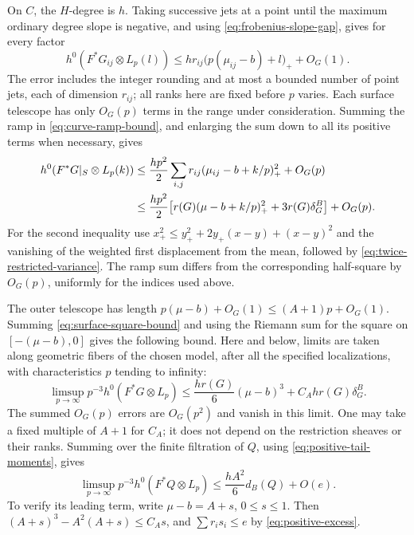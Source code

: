 On $C$, the $H$-degree is $h$.  Taking successive jets at a point
until the maximum ordinary degree slope is negative, and using
\eqref{eq:frobenius-slope-gap}, gives for every factor
\begin{equation}\label{eq:curve-ramp-bound}
 h^0(F^*G_{ij}\otimes L_p(l))
 \leq h r_{ij}\bigl(p(\mu_{ij}-b)+l\bigr)_++O_G(1).
\end{equation}
The error includes the integer rounding and at most a bounded
number of point jets, each of dimension $r_{ij}$; all ranks here
are fixed before $p$ varies.  Each surface telescope has only
$O_G(p)$ terms in the range under consideration.  Summing the
ramp in \eqref{eq:curve-ramp-bound}, and enlarging the sum down
to all its positive terms when necessary, gives
\begin{align}
 h^0(F^*G|_S\otimes L_p(k))
 &\leq\frac{hp^2}{2}\sum_{i,j}r_{ij}
        (\mu_{ij}-b+k/p)_+^2+O_G(p)\notag\\
 &\leq\frac{hp^2}{2}\bigl[
 r(G)(\mu-b+k/p)_+^2+3r(G)\delta_G^B\bigr]+O_G(p).
 \label{eq:surface-square-bound}
\end{align}
For the second inequality use
$x_+^2\leq y_+^2+2y_+(x-y)+(x-y)^2$ and the vanishing of the
weighted first displacement from the mean, followed by
\eqref{eq:twice-restricted-variance}.  The ramp sum differs from
the corresponding half-square by $O_G(p)$, uniformly for the
indices used above.

The outer telescope has length
$p(\mu-b)+O_G(1)\leq(A+1)p+O_G(1)$.  Summing
\eqref{eq:surface-square-bound} and using the Riemann sum for
the square on $[-(\mu-b),0]$ gives the following bound.
Here and below, limits are taken along geometric fibers of the chosen
model, after all the specified localizations, with characteristics
$p$ tending to infinity:
\begin{equation}\label{eq:tail-factor-frobenius}
 \limsup_{p\to\infty}p^{-3}h^0(F^*G\otimes L_p)
 \leq\frac{h r(G)}6(\mu-b)^3
       +C_Ah r(G)\delta_G^B.
\end{equation}
The summed $O_G(p)$ errors are $O_G(p^2)$ and vanish in this
limit.  One may take a fixed multiple of $A+1$ for $C_A$;
it does not depend on the restriction sheaves or their ranks.
Summing over the finite filtration of $Q$, using
\eqref{eq:positive-tail-moments}, gives
\begin{equation}\label{eq:tail-frobenius}
 \limsup_{p\to\infty}p^{-3}h^0(F^*Q\otimes L_p)
 \leq\frac{hA^2}{6}d_B(Q)+O(e).
\end{equation}
To verify its leading term, write $\mu-b=A+s$, $0\leq s\leq1$.
Then $(A+s)^3-A^2(A+s)\leq C_As$, and
$\sum r_is_i\leq e$ by \eqref{eq:positive-excess}.

